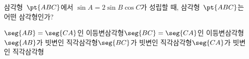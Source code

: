 삼각형~$\pt{ABC}$에서 $\sin A=2\sin B\cos C$가 성립할 때, 삼각형~$\pt{ABC}$는 어떤 삼각형인가?
\begin{choicesv}{$\seg{AB}=\seg{CA}$인 이등변삼각형}{$\seg{BC}=\seg{CA}$인 이등변삼각형}{$\seg{AB}$가 빗변인 직각삼각형}{$\seg{BC}$가 빗변인 직각삼각형}{$\seg{CA}$가 빗변인 직각삼각형}\end{choicesv}
